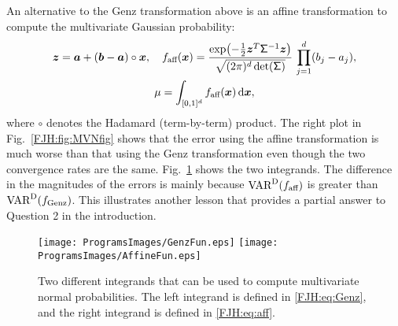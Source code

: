 \documentclass[graybox,footinfo]{svmult}
\begin{document}
\begin{FJHLesson}
\FJHLessonThree
\end{FJHLesson}

\begin{FJHLesson}
	\FJHLessonSeven
\end{FJHLesson}

An alternative to the Genz transformation above is an affine transformation to compute 
the multivariate Gaussian probability:
\begin{gather}
\label{FJH:eq:aff}
\bsz = \bsa + (\bsb-\bsa) \circ \bsx, \quad f_{\textup{aff}}(\bsx) =  \frac{\exp\bigl(- 
\frac 12 \bsz^T
\mathsf{\Sigma}^{-1} \bsz 
	\bigr)}{\sqrt{(2 \pi)^d \det(\mathsf{\Sigma})}} \, \prod_{j=1}^d (b_j - a_j), \\
\nonumber
\mu = 
	\int_{[0,1]^{d}} f_{\textup{aff}}(\bsx) \, \D \bsx,
\end{gather} 
where $\circ$ denotes the Hadamard (term-by-term) product.  The right plot in Fig.\ 
\ref{FJH:fig:MVNfig} shows that the error using the affine 
transformation is much worse than that using the Genz transformation even though the 
two convergence rates are the same.  Fig.\ \ref{FJH:fig:GenzAff} shows the two 
integrands.  The difference in the magnitudes of the errors is 
mainly because $\textup{VAR}^{\textup{D}}(f_{\textup{aff}})$ is greater than 
$\textup{VAR}^{\textup{D}}(f_{\textup{Genz}})$.  This illustrates another 
lesson that provides a partial answer to Question 2 in the introduction.


\begin{figure}
	\centering
	\texttt{[image: ProgramsImages/GenzFun.eps]} \qquad 
	\texttt{[image: ProgramsImages/AffineFun.eps]}
	\caption{Two different integrands that can be used to compute multivariate normal 
	probabilities.  The left integrand is defined in \eqref{FJH:eq:Genz}, and the right 
	integrand is defined in  \eqref{FJH:eq:aff}.
		\label{FJH:fig:GenzAff}}
\end{figure}


\begin{FJHLesson} \label{FJH:eq:lessonfour}
	\FJHLessonFour
\end{FJHLesson}
\end{document}
